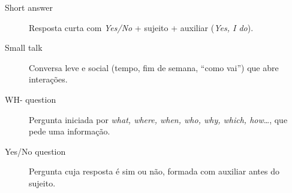 \documentclass[12pt,a4paper,oneside]{book}
\newcommand{\en}[1]{\textit{#1}}                 %
\begin{document}
\begin{description}
  \item[Short answer] Resposta curta com \en{Yes/No} + sujeito + auxiliar (\en{Yes, I do}).
  \item[Small talk] Conversa leve e social (tempo, fim de semana, ``como vai'') que abre interações.
  \item[WH- question] Pergunta iniciada por \en{what, where, when, who, why, which, how}\ldots, que pede uma informação.
  \item[Yes/No question] Pergunta cuja resposta é sim ou não, formada com auxiliar antes do sujeito.
\end{description}

\printindex
\end{document}
